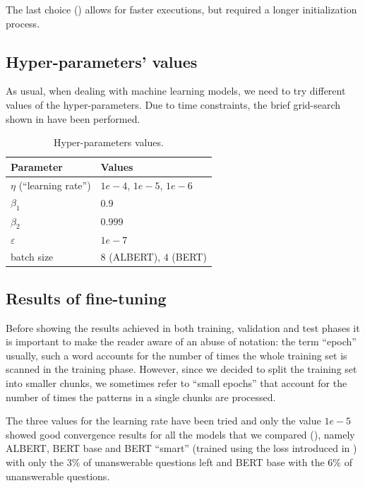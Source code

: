 \documentclass[10pt,hidelinks]{article}
\def\colOne{white}
\def\colTwo{pblue!10}
\def\colHea{pblue!35}
\begin{document}
The last choice () allows for faster executions, but required a longer initialization process.

\subsection{Hyper-parameters' values}
As usual, when dealing with machine learning models, we need to try different values of the hyper-parameters. Due to time constraints, the brief grid-search shown in  have been performed.

\begin{table}[ht!]
	\footnotesize\centering
	\rowcolors{2}{\colOne}{\colTwo}
	\begin{tabular}{|l|p{60mm}|}
		\hline\rowcolor{\colHea} Parameter & Values\\\hline\hline
		$ \eta $ (``learning rate'') & $ 1e-4$, $1e-5$, $1e-6$ \\
		$\beta_1$ & $0.9$\\
		$\beta_2$ & $0.999$\\
		$\varepsilon$ & $1e-7$\\
		batch size & $8$ (ALBERT), $4$ (BERT)\\
		\end{tabular}
	\caption{Hyper-parameters values.}\label{tab:grid_search}
\end{table}

\subsection{Results of fine-tuning}
Before showing the results achieved in both training, validation and test phases it is important to make the reader aware of an abuse of notation: the term ``epoch'' usually, such a word accounts for the number of times the whole training set is scanned in the training phase.
However, since we decided to split the training set into smaller chunks, we sometimes refer to ``small epochs'' that account for the number of times the patterns in a single chunks are processed.

The three values for the learning rate have been tried and only the value $1e-5$ showed good convergence results for all the models that we compared (), namely ALBERT, BERT base and BERT ``smart'' (trained using the loss introduced in ) with only the $3\%$ of unanswerable questions left and BERT base with the $6\%$ of unanswerable questions. 
\end{document}
